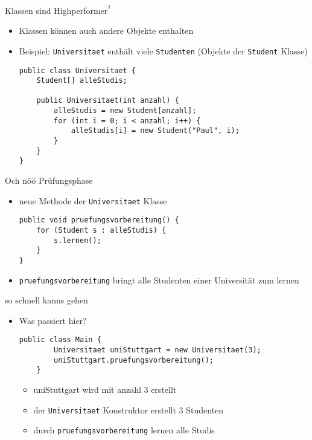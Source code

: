 \documentclass{../../presentation}
\begin{document}
\begin{frame}[fragile]{Klassen sind Highperformer\textsuperscript{²}}

\begin{itemize}
  \item<2-> Klassen können auch andere Objekte enthalten
  \item<3-> Beispiel: \texttt{Universitaet} enthält viele \texttt{Studenten} (Objekte der \texttt{Student} Klasse)
\begin{verbatim}
public class Universitaet {
    Student[] alleStudis;

    public Universitaet(int anzahl) {
        alleStudis = new Student[anzahl];
        for (int i = 0; i < anzahl; i++) {
            alleStudis[i] = new Student("Paul", i);
        }
    }
}
\end{verbatim}
\end{itemize}
\end{frame}


\begin{frame}[fragile]{Och nöö Prüfungsphase}

\begin{itemize}
  \item<2-> neue Methode der \texttt{Universitaet} Klasse
\begin{verbatim}
public void pruefungsvorbereitung() {
    for (Student s : alleStudis) {
        s.lernen();
    }
}
\end{verbatim}
  \item<3-> \texttt{pruefungsvorbereitung} bringt alle Studenten einer Universität zum lernen
\end{itemize}
\end{frame}

\begin{frame}[fragile]{so schnell kanns gehen}

\begin{itemize}
  \item<2-> Was passiert hier?
\begin{verbatim}
public class Main {
        Universitaet uniStuttgart = new Universitaet(3);
        uniStuttgart.pruefungsvorbereitung();
    }
\end{verbatim}
  \begin{itemize}
		\item<4->[\textbullet]uniStuttgart wird mit anzahl 3 erstellt 
		\item<5->[\textbullet]der \texttt{Universitaet} Konstruktor erstellt 3 Studenten
		\item<6->[\textbullet]durch \texttt{pruefungsvorbereitung} lernen alle Studis
	\end{itemize}
\end{itemize}
\end{frame}
\end{document}
